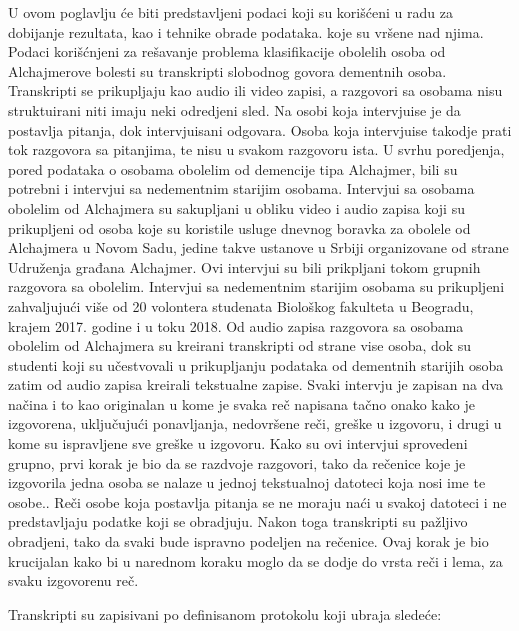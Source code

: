 \documentclass[12pt,oneside]{memoir}
\begin{document}
U ovom poglavlju će biti predstavljeni podaci koji su korišćeni u radu za dobijanje rezultata,  kao i tehnike obrade podataka. koje su vršene nad njima.  Podaci korišćnjeni za rešavanje problema klasifikacije obolelih osoba od Alchajmerove bolesti su transkripti slobodnog govora dementnih osoba. Transkripti se prikupljaju kao audio ili video zapisi,  a razgovori sa osobama nisu struktuirani niti imaju neki odredjeni sled.  Na osobi koja intervjuise je da postavlja pitanja,  dok intervjuisani odgovara.  Osoba koja intervjuise takodje prati tok razgovora sa pitanjima,  te nisu u svakom razgovoru ista.  
U svrhu poredjenja, pored podataka o osobama obolelim od demencije tipa Alchajmer,  bili su potrebni i intervjui sa nedementnim starijim osobama. Intervjui sa osobama obolelim od Alchajmera su sakupljani u obliku video i audio zapisa koji su prikupljeni od osoba koje su koristile usluge dnevnog boravka za obolele od Alchajmera u Novom Sadu,  jedine takve ustanove u Srbiji organizovane od strane Udruženja građana Alchajmer.  Ovi intervjui su bili prikpljani tokom grupnih razgovora sa obolelim.  Intervjui sa nedementnim starijim osobama su prikupljeni zahvaljujući više od 20 volontera studenata Biološkog fakulteta u Beogradu,  krajem 2017. godine i u toku 2018.
Od audio zapisa razgovora sa osobama obolelim od Alchajmera su kreirani transkripti od strane vise osoba,  dok su studenti koji su učestvovali u prikupljanju podataka od dementnih starijih osoba zatim od audio zapisa kreirali tekstualne zapise.  Svaki intervju je zapisan na dva načina i to kao originalan u kome je svaka reč napisana tačno onako kako je izgovorena, uključujući ponavljanja, nedovršene reči, greške u izgovoru, i drugi u kome su ispravljene sve greške u izgovoru.  Kako su ovi intervjui sprovedeni grupno,  prvi korak je bio da se razdvoje razgovori,  tako da rečenice koje je izgovorila jedna osoba se nalaze u jednoj tekstualnoj datoteci koja nosi ime te osobe.. Reči osobe koja postavlja pitanja se ne moraju naći u svakoj datoteci i ne predstavljaju podatke koji se obradjuju.  Nakon toga transkripti su pažljivo obradjeni,  tako da svaki bude ispravno podeljen na rečenice.  Ovaj korak je bio krucijalan kako bi u narednom koraku moglo da se dodje do vrsta reči i lema,  za svaku izgovorenu reč.  

Transkripti su zapisivani po definisanom protokolu koji ubraja sledeće:
\end{document}
